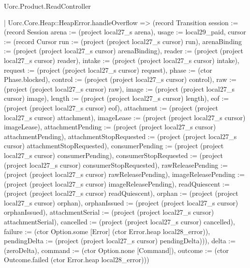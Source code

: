 \begin{lexlean}{Uorc.Product.ReadController}
\begin{semanticmodule}
{    | Uorc.Core.Heap::HeapError.handleOverflow => (record Transition {session := (record Session {arena := (project local27_s arena), usage := local29_paid, cursor := (record Cursor {run := (project (project local27_s cursor) run), arenaBinding := (project (project local27_s cursor) arenaBinding), reader := (project (project local27_s cursor) reader), intake := (project (project local27_s cursor) intake), request := (project (project local27_s cursor) request), phase := (ctor Phase.blocked), control := (project (project local27_s cursor) control), raw := (project (project local27_s cursor) raw), image := (project (project local27_s cursor) image), length := (project (project local27_s cursor) length), eof := (project (project local27_s cursor) eof), attachment := (project (project local27_s cursor) attachment), imageLease := (project (project local27_s cursor) imageLease), attachmentPending := (project (project local27_s cursor) attachmentPending), attachmentStopRequested := (project (project local27_s cursor) attachmentStopRequested), consumerPending := (project (project local27_s cursor) consumerPending), consumerStopRequested := (project (project local27_s cursor) consumerStopRequested), rawReleasePending := (project (project local27_s cursor) rawReleasePending), imageReleasePending := (project (project local27_s cursor) imageReleasePending), readQuiescent := (project (project local27_s cursor) readQuiescent), orphan := (project (project local27_s cursor) orphan), orphanIssued := (project (project local27_s cursor) orphanIssued), attachmentSerial := (project (project local27_s cursor) attachmentSerial), cancelled := (project (project local27_s cursor) cancelled), failure := (ctor Option.some [Error] (ctor Error.heap local28_error)), pendingDelta := (project (project local27_s cursor) pendingDelta)})}), delta := (zeroDelta), command := (ctor Option.none [Command]), outcome := (ctor Outcome.failed (ctor Error.heap local28_error))})
}
\end{semanticmodule}
\end{lexlean}
